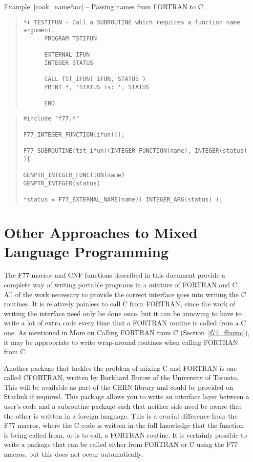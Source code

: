 \documentclass[twoside,11pt]{article}
\newcommand{\htmlref}[2]{#1}
\newcommand{\latex}[1]{#1}
\newcommand{\xlabel}[1]{}
\renewcommand{\_}{\texttt{\symbol{95}}}
\newcounter{examples}
\begin{document}
\label{cook_nameftoc}
\begin{center}
Example\latex{~\ref{cook_nameftoc}}
-- Passing names from FORTRAN to C.
\end{center}

{\small \begin{quote} \begin{verbatim}
*+ TESTIFUN - Call a SUBROUTINE which requires a function name argument.
      PROGRAM TSTIFUN

      EXTERNAL IFUN
      INTEGER STATUS

      CALL TST_IFUN( IFUN, STATUS )
      PRINT *, 'STATUS is: ', STATUS

      END
\end{verbatim} \end{quote} }
{\small \begin{quote} \begin{verbatim}
#include "f77.h"

F77_INTEGER_FUNCTION(ifun)();

F77_SUBROUTINE(tst_ifun)(INTEGER_FUNCTION(name), INTEGER(status) ){

GENPTR_INTEGER_FUNCTION(name)
GENPTR_INTEGER(status)

*status = F77_EXTERNAL_NAME(name)( INTEGER_ARG(status) );
\end{verbatim} \end{quote} }


\section{\xlabel{other_approaches_to_mixed_language_programming}Other Approaches to Mixed Language Programming}

The F77 macros and CNF functions described in this document provide a
complete way of writing portable programs in a mixture of FORTRAN and C\@. 
All of the work necessary to provide the correct interface goes into writing
the C routines. It is relatively painless to call C from FORTRAN, since the
work of writing the interface need only be done once, but it can be annoying to
have to write a lot of extra code every time that a FORTRAN routine is called
from a C one. 
As mentioned in 
\htmlref{More on Calling FORTRAN from C}{f77_ffromc}
\latex{(Section~\ref{f77_ffromc})}, it may be appropriate to write 
wrap-around routines when calling FORTRAN from C\@.

Another package that tackles the problem of mixing C and FORTRAN is one called
CFORTRAN, written by Burkhard Burow of the University of Toronto. This will be
available as part of the CERN library and could be provided on Starlink if
required. This package allows you to write an interface layer between a user's
code and a subroutine package such that neither side need be aware that the
other is written in a foreign language. This is a crucial difference from the
F77 macros, where the C code is written in the full knowledge that the function
is being called from, or is to call, a FORTRAN routine. It is certainly
possible to write a package that can be called either from FORTRAN or C using
the F77 macros, but this does not occur automatically.
\end{document}
